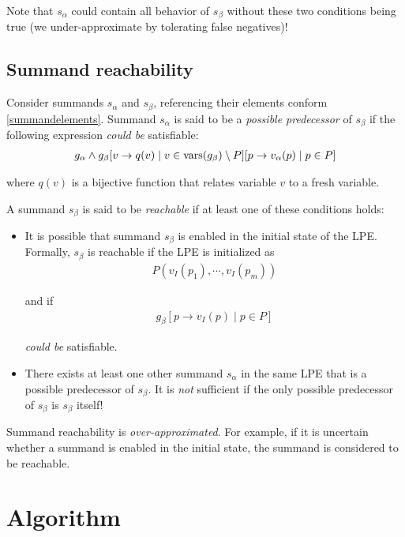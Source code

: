 Note that $s_\alpha$ could contain all behavior of $s_\beta$ without these two conditions being true (we under-approximate by tolerating false negatives)!

\subsection{Summand reachability}

Consider summands $s_\alpha$ and $s_\beta$, referencing their elements conform \ref{summandelements}.
Summand $s_\alpha$ is said to be a \emph{possible predecessor} of $s_\beta$ if the following expression \emph{could be} satisfiable:
\begin{align*}
g_\alpha \land {g_\beta}[v \rightarrow q(v) \;|\; v \in \text{vars}(g_\beta) \setminus P][p \rightarrow v_\alpha(p) \;|\; p \in P]
\end{align*}

where $q(v)$ is a bijective function that relates variable $v$ to a fresh variable.

A summand $s_\beta$ is said to be \emph{reachable} if at least one of these conditions holds:

\begin{itemize}
\item It is possible that summand $s_\beta$ is enabled in the initial state of the LPE.
Formally, $s_\beta$ is reachable if the LPE is initialized as
\begin{align*}
P(v_I(p_1), \cdots{}, v_I(p_m))
\end{align*}

and if
\begin{align*}
g_\beta[p \rightarrow v_I(p) \;|\; p \in P]
\end{align*}

\emph{could be} satisfiable.

\item There exists at least one other summand $s_\alpha$ in the same LPE that is a possible predecessor of $s_\beta$.
It is \emph{not} sufficient if the only possible predecessor of $s_\beta$ is $s_\beta$ itself!
\end{itemize}

Summand reachability is \emph{over-approximated}.
For example, if it is uncertain whether a summand is enabled in the initial state, the summand is considered to be reachable.

\section{Algorithm}

